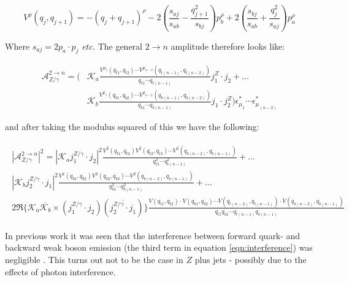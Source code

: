 	\begin{equation}
		V^\rho(q_j, q_{j+1}) = -(q_j + q_{j+1})^\rho - 2\left(\frac{s_{aj}}{s_{ab}} -
			\frac{q^2_{j+1}}{s_{bj}}\right)p_b^\rho + 2\left(\frac{s_{bj}}{s_{ab}} +
			\frac{q_j^2}{s_{aj}}\right)p_a^\rho
			\label{eqn:effectivevertex}
	\end{equation}

	Where $s_{aj} = 2p_a\cdot p_j$ \emph{etc.}  The general $2\rightarrow n$ amplitude therefore looks like:

	\begin{align}
		\mathcal{A}^{2\rightarrow n}_{Z/\gamma} = \Bigg(&\mathcal{K}_a\frac{V^{\mu_1}(q_{t1}, q_{t2})\cdots
			V^{\mu_{n-2}}(q_{t(n-1)}, q_{t(n-2)})} {q_{t1}\cdots q_{t(n-1)}} j_1^Z\cdot j_2 +\ldots\\\nonumber
			&\mathcal{K}_b\frac{V^{\mu_1}(q_{b1}, q_{b2})\cdots V^{\mu_{n-2}}(q_{b(n-1)}, q_{b(n-2)})} {q_{b1}
			\cdots q_{b(n-1)}} j_1  \cdot j_2^Z\Bigg)\epsilon^*_{\mu_1}\cdots\epsilon^*_{\mu_{(n-2)}}
	\end{align}

	and after taking the modulus squared of this we have the following:

	\begin{align}
	\begin{split}
		|\mathcal{A}_{Z/\gamma}^{2\rightarrow n}|^2 = \left|\mathcal{K}_a j_1^{Z/\gamma}\cdot j_2\right|^2
			\frac{V^2(q_{t1}, q_{t2}) V^2(q_{t2}, q_{t3}) \cdots V^2(q_{b(n-2)}, q_{b(n-1)})}{q^2_{t1}\cdots
			q^2_{t(n-1)}} +\ldots\\
			\left|\mathcal{K}_b j_2^{Z/\gamma}\cdot j_1\right|^2 \frac{V^2(q_{b1}, q_{b2}) V^2(q_{b2}, q_{b3})
			\cdots V^2(q_{b(n-2)}, q_{b(n-1)})}{q^2_{b1}\cdots q^2_{b(n-1)}} +\ldots\\
			2\Re\{\mathcal{K}_a\overline{\mathcal{K}_b} \times (j_1^{Z/\gamma}\cdot j_2)(\overline{j_2^{Z/\gamma}\cdot
			j_1})\}\frac{V(q_{t1}, q_{t2})\cdot V(q_{b1}, q_{b2})\cdots V(q_{t(n-2)}, q_{t(n-1)})\cdot V(q_{b(n-2)},
			q_{b(n-1)})}{q_{t1}q_{b1}\cdots q_{t(n-1)}q_{b(n-1)}}
			\label{eqn:interference}
	\end{split}
	\end{align}

	In previous work it was seen that the interference between forward quark- and backward weak boson emission
	(the third term in equation \ref{eqn:interference}) was negligible \cite{Wjets}.  This turns out not to be
	the case in $Z$ plus jets - possibly due to the effects of photon interference.

